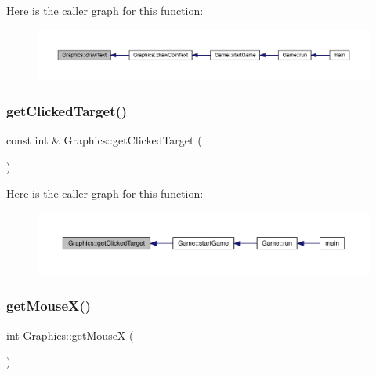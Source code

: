 Here is the caller graph for this function\+:\nopagebreak
\begin{figure}[H]
\begin{center}
\leavevmode
\includegraphics[width=350pt]{class_graphics_a3b78a92ad6cd4daaa44291df5c5c3e55_icgraph}
\end{center}
\end{figure}
\mbox{\label{class_graphics_ad622b701dc7888a814fbd934a766c457}} 
\subsubsection{\texorpdfstring{get\+Clicked\+Target()}{getClickedTarget()}}
{\footnotesize\ttfamily const int \& Graphics\+::get\+Clicked\+Target (\begin{DoxyParamCaption}{ }\end{DoxyParamCaption})}

Here is the caller graph for this function\+:\nopagebreak
\begin{figure}[H]
\begin{center}
\leavevmode
\includegraphics[width=350pt]{class_graphics_ad622b701dc7888a814fbd934a766c457_icgraph}
\end{center}
\end{figure}
\mbox{\label{class_graphics_a48c86f4a3a87446fd8df707899e92d4f}} 
\subsubsection{\texorpdfstring{get\+Mouse\+X()}{getMouseX()}}
{\footnotesize\ttfamily int Graphics\+::get\+MouseX (\begin{DoxyParamCaption}{ }\end{DoxyParamCaption})}

